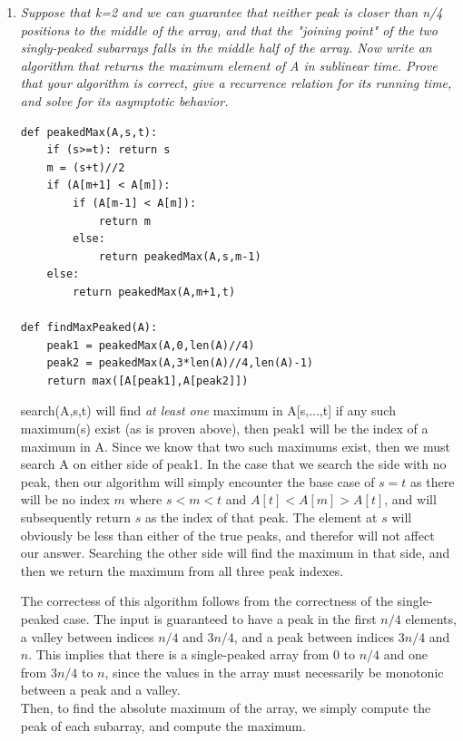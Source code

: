 \documentclass[12pt]{article}
\begin{document}
\begin{enumerate}
\begin{enumerate}
    	\item \textit{Suppose that k=2 and we can guarantee that neither peak is closer than n/4 positions to the middle of the array, and that the "joining point" of the two singly-peaked subarrays falls in the middle half of the 
array. Now write an algorithm that returns the maximum element of A in sublinear time. Prove that your algorithm is correct, give a recurrence relation for its running time, and solve for its asymptotic behavior.}
    	
        \begin{verbatim}
def peakedMax(A,s,t):
    if (s>=t): return s
    m = (s+t)//2
    if (A[m+1] < A[m]):
        if (A[m-1] < A[m]):
            return m
        else:
            return peakedMax(A,s,m-1)
    else:
        return peakedMax(A,m+1,t)

def findMaxPeaked(A):
    peak1 = peakedMax(A,0,len(A)//4)
    peak2 = peakedMax(A,3*len(A)//4,len(A)-1)
    return max([A[peak1],A[peak2]])
        \end{verbatim}
\textsf{search(A,s,t)} will find \textit{at least one} maximum in A[s,...,t] if any such maximum(s) exist (as is proven above), then peak1 will be the index of a maximum in A. Since we know that two such maximums exist, then we 
must search A on either side of peak1. In the case that we search the side with no peak, then our algorithm will simply encounter the base case of $s=t$ as there will be no index $m$ where $s<m<t$ and $A[t]<A[m]>A[t]$, and will 
subsequently return $s$ as the index of that peak. The element at $s$ will obviously be less than either of the true peaks, and therefor will not affect our answer. Searching the other side will find the maximum in that side, and 
then we return the maximum from all three peak indexes. 
    
    The correctess of this algorithm follows from the correctness of the single-peaked case. The input is guaranteed to have a peak in the first $n/4$ elements, a valley between indices $n/4$ and $3n/4$, and a peak between indices 
$3n/4$ and $n$. This implies that there is a single-peaked array from $0$ to $n/4$ and one from $3n/4$ to $n$, since the values in the array must necessarily be monotonic between a peak and a valley.\\
    
    Then, to find the absolute maximum of the array, we simply compute the peak of each subarray, and compute the maximum.
    

\end{enumerate}
\end{enumerate}
\end{document}
